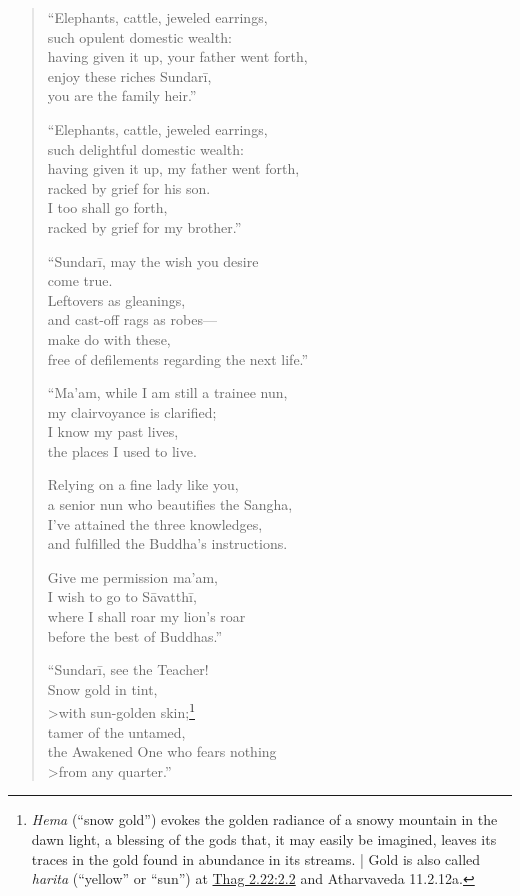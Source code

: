 \documentclass[12pt,openany]{book}%
\begin{document}
\begin{verse}
“Elephants, cattle, jeweled earrings, \\
such opulent domestic wealth: \\
having given it up, your father went forth, \\
enjoy these riches \textsanskrit{Sundarī}, \\
you are the family heir.” 

“Elephants, cattle, jeweled earrings, \\
such delightful domestic wealth: \\
having given it up, my father went forth, \\
racked by grief for his son. \\
I too shall go forth, \\
racked by grief for my brother.” 

“\textsanskrit{Sundarī}, may the wish you desire \\
come true. \\
Leftovers as gleanings, \\
and cast-off rags as robes—\\
make do with these, \\
free of defilements regarding the next life.” 

“Ma’am, while I am still a trainee nun, \\
my clairvoyance is clarified; \\
I know my past lives, \\
the places I used to live. 

Relying on a fine lady like you, \\
a senior nun who beautifies the Sangha, \\
I’ve attained the three knowledges, \\
and fulfilled the Buddha’s instructions. 

Give me permission ma’am, \\
I wish to go to \textsanskrit{Sāvatthī}, \\
where I shall roar my lion’s roar \\
before the best of Buddhas.” 

“\textsanskrit{Sundarī}, see the Teacher! \\
Snow gold in tint, \\>with sun-golden skin;\footnote{\textit{Hema}  (“snow gold”) evokes the golden radiance of a snowy mountain in the dawn light, a blessing of the gods that, it may easily be imagined, leaves its traces in the gold found in abundance in its streams. | Gold is also called \textit{harita} (“yellow” or “sun”) at \href{https://suttacentral.net/thag2.22/en/sujato\#2.2}{Thag 2.22:2.2} and Atharvaveda 11.2.12a. } \\
tamer of the untamed, \\
the Awakened One who fears nothing \\>from any quarter.” 


\end{verse}
\end{document}
